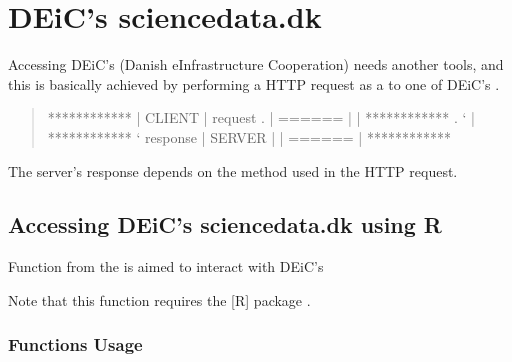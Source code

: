 \documentclass[a4paper,12pt,english]{sphinxhowto}
\begin{document}
\section{DEiC’s sciencedata.dk}
\label{\detokenize{Sciencedata_dk:deic-s-sciencedata-dk}}\label{\detokenize{Sciencedata_dk:deic-sddk}}\label{\detokenize{Sciencedata_dk::doc}}
Accessing DEiC’s (Danish e\sphinxhyphen{}Infrastructure Cooperation) 
needs another tools, and this is basically achieved by performing a HTTP request as a 
to one of DEiC’s .
\begin{quote}

\begin{sphinxVerbatim}[commandchars=\\\{\},formatcom=\footnotesize]
************
|  CLIENT  | \PYGZhy{}\PYGZhy{}\PYGZgt{}\PYGZhy{}\PYGZhy{}\PYGZgt{}  request  \PYGZhy{}\PYGZgt{}\PYGZhy{}\PYGZhy{}\PYGZgt{}\PYGZhy{}\PYGZhy{}\PYGZgt{}\PYGZhy{}\PYGZhy{}\PYGZgt{}\PYGZhy{}\PYGZhy{}\PYGZgt{}.
|  ======  |                                |
************                                .
     `                                      |
     \PYGZca{}                                 ************
     `\PYGZlt{}\PYGZhy{}\PYGZhy{}\PYGZlt{}\PYGZhy{}\PYGZhy{}\PYGZlt{}\PYGZhy{}\PYGZhy{}\PYGZlt{}\PYGZhy{}\PYGZhy{}\PYGZlt{}  response  \PYGZlt{}\PYGZhy{}\PYGZhy{} \PYGZlt{}\PYGZhy{}\PYGZhy{} |  SERVER  |
                                       |  ======  |
                                       ************
\end{sphinxVerbatim}
\end{quote}


The server’s response depends on the method used in the HTTP request.



\subsection{Accessing DEiC’s sciencedata.dk using R}
\label{\detokenize{Sciencedata_dk:accessing-deic-s-sciencedata-dk-using-r}}
Function 
from the  is aimed to interact
with DEiC’s 

Note that this function requires the {[}R{]} package .


\subsubsection{Functions Usage}
\label{\detokenize{Sciencedata_dk:functions-usage}}
\end{document}
